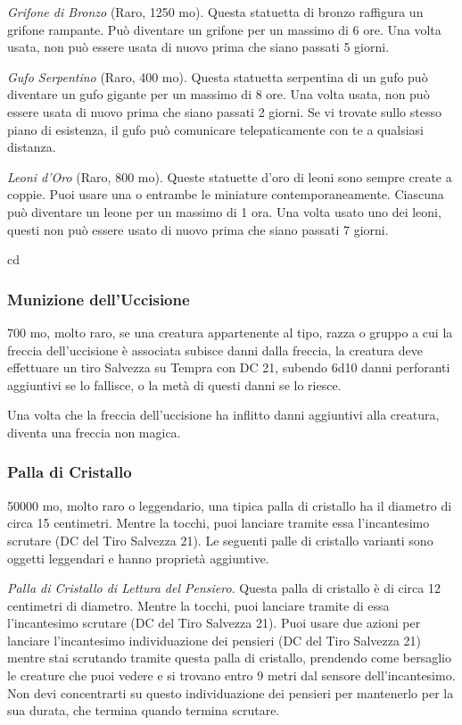 \begin{multicols}{2}
	\textit{Grifone di Bronzo} (Raro, 1250 mo). Questa statuetta di bronzo raffigura un grifone rampante. Può diventare un grifone per un massimo di 6 ore. Una volta usata, non può essere usata di nuovo prima che siano passati 5 giorni.

	\textit{Gufo Serpentino} (Raro, 400 mo). Questa statuetta serpentina di un gufo può diventare un gufo gigante per un massimo di 8 ore. Una volta usata, non può essere usata di nuovo prima che siano passati 2 giorni. Se vi trovate sullo stesso piano di esistenza, il gufo può comunicare telepaticamente con te a qualsiasi distanza.

	\textit{Leoni d'Oro} (Raro, 800 mo). Queste statuette d'oro di leoni sono sempre create a coppie. Puoi usare una o entrambe le miniature contemporaneamente. Ciascuna può diventare un leone per un massimo di 1 ora. Una volta usato uno dei leoni, questi non può essere usato di nuovo prima che siano passati 7 giorni.

	cd \subsubsection*{Munizione dell'Uccisione}
	700 mo, molto raro, se una creatura appartenente al tipo, razza o gruppo a cui la freccia dell'uccisione è associata subisce danni dalla freccia, la creatura deve effettuare un tiro Salvezza su Tempra con DC 21, subendo 6d10 danni perforanti aggiuntivi se lo fallisce, o la metà di questi danni se lo riesce.

	Una volta che la freccia dell'uccisione ha inflitto danni aggiuntivi alla creatura, diventa una freccia non magica.

	\subsubsection*{Palla di Cristallo}
	50000 mo, molto raro o leggendario, una tipica palla di cristallo ha il diametro di circa 15 centimetri. Mentre la tocchi, puoi lanciare tramite essa l'incantesimo scrutare (DC del Tiro Salvezza 21). Le seguenti palle di cristallo varianti sono oggetti leggendari e hanno proprietà aggiuntive.

	\textit{Palla di Cristallo di Lettura del Pensiero}. Questa palla di cristallo è di circa 12 centimetri di diametro. Mentre la tocchi, puoi lanciare tramite di essa l'incantesimo scrutare (DC del Tiro Salvezza 21). Puoi usare due azioni per lanciare l'incantesimo individuazione dei pensieri (DC del Tiro Salvezza 21) mentre stai scrutando tramite questa palla di cristallo, prendendo come bersaglio le creature che puoi vedere e si trovano entro 9 metri dal sensore dell'incantesimo. Non devi concentrarti su questo individuazione dei pensieri per mantenerlo per la sua durata, che termina quando termina scrutare.


\end{multicols}
